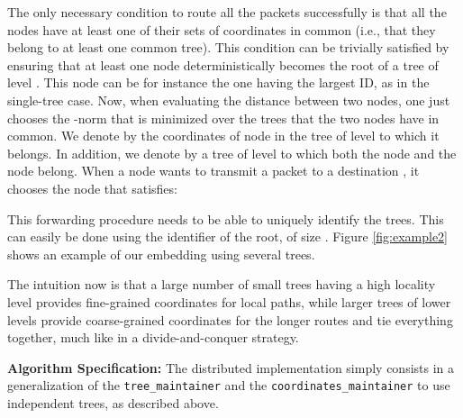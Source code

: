 \documentclass[conference]{IEEEtran}
\begin{document}
The only necessary condition to route all the packets successfully is that all the nodes have at least one of their  sets of coordinates in common (i.e., that they belong to at least one common tree). This condition 
can be trivially satisfied by ensuring that at least one node deterministically becomes the root of a tree of level . 
This node can be for instance the one having the largest ID, as in the single-tree case.
Now, when evaluating the distance between two nodes, one just chooses the -norm that is minimized over the trees that the two nodes have in common.
We denote by  the coordinates of node  in the tree of level  to which it belongs. In addition, we denote by  a tree of level  to which both the node  and the node  belong.
When a node  wants to transmit a packet to a destination , it chooses the node that satisfies:

This forwarding procedure needs to be able to uniquely identify the trees. This can easily be done using the identifier of the root, of size .
Figure \ref{fig:example2} shows an example of our embedding using several trees.

The intuition now is that a large number of small trees having a high locality level provides fine-grained coordinates for local paths, while larger trees of lower levels provide coarse-grained coordinates for the longer routes and tie everything together, much like in a divide-and-conquer strategy.


\textbf{Algorithm Specification: }
The distributed implementation simply consists in a generalization of the \texttt{tree\_maintainer} and the \texttt{coordinates\_maintainer} to use  independent trees, as described above.
\end{document}
